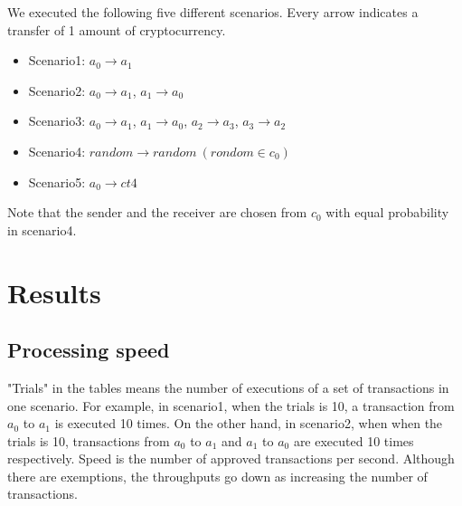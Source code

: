 \documentclass[a4paper, oneside]{discothesis}
\begin{document}
We executed the following five different scenarios.
Every arrow indicates a transfer of 1 amount of cryptocurrency.
\begin{itemize}
    \item Scenario1: $a_0 \rightarrow a_1$
    \item Scenario2: $a_0 \rightarrow a_1$, $a_1 \rightarrow a_0$
    \item Scenario3: $a_0 \rightarrow a_1$, $a_1 \rightarrow a_0$, $a_2 \rightarrow a_3$, $a_3 \rightarrow a_2$
    \item Scenario4: $random \rightarrow random~(rondom \in c_0)$
    \item Scenario5: $a_0 \rightarrow ct4$
\end{itemize}
Note that the sender and the receiver are chosen from $c_0$ with equal probability in scenario4.

\section{Results}

\subsection{Processing speed}
"Trials" in the tables means the number of executions of a set of transactions in one scenario.
For example, in scenario1, when the trials is 10, a transaction from $a_0$ to $a_1$
is executed 10 times.
On the other hand, in scenario2, when when the trials is 10,
transactions from $a_0$ to $a_1$ and $a_1$ to $a_0$ are executed 10 times respectively.
Speed is the number of approved transactions per second.
Although there are exemptions, the throughputs go down as increasing the number of transactions.
\end{document}
